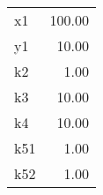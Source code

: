 \documentclass[10pt,a4paper]{article}
\begin{document}
\begin{table}[ht]
\centering
\begin{tabular}{lr}
  \hline
  \hline
x1 & 100.00 \\ 
  y1 & 10.00 \\ 
  k2 & 1.00 \\ 
  k3 & 10.00 \\ 
  k4 & 10.00 \\ 
  k51 & 1.00 \\ 
  k52 & 1.00 \\ 
   \hline
\end{tabular}
\end{table}
 
\end{document}
